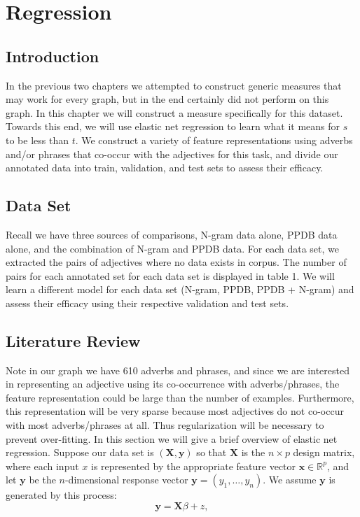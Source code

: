 \section{Regression}

\subsection{Introduction}

In the previous two chapters we attempted to construct generic measures that may work for every graph, but in the end certainly did not perform on this graph. In this chapter we will construct a measure specifically for this dataset. Towards this end, we will use elastic net regression to learn what it means for $s$ to be less than $t$. We construct a variety of feature representations using adverbs and/or phrases that co-occur with the adjectives for this task, and divide our annotated data into train, validation, and test sets to assess their efficacy. 

\subsection{Data Set}

Recall we have three sources of comparisons, N-gram data alone, PPDB data alone, and the combination of N-gram and PPDB data. For each data set, we extracted the pairs of adjectives where no data exists in corpus. The number of pairs for each annotated set for each data set is displayed in table 1. We will learn a different model for each data set (N-gram, PPDB, PPDB + N-gram) and assess their efficacy using their respective validation and test sets. 

\subsection{Literature Review}

Note in our graph we have 610 adverbs and phrases, and since we are interested in representing an adjective using its co-occurrence with adverbs/phrases, the feature representation could be large than the number of examples. Furthermore, this representation will be very sparse because most adjectives do not co-occur with most adverbs/phrases at all. Thus regularization will be necessary to prevent over-fitting. In this section we will give a brief overview of elastic net regression. Suppose our data set is $(\pmb{X}, \pmb{y})$ so that $\pmb{X}$ is the $n \times p$ design matrix, where each input $x$ is represented by the appropriate feature vector $\pmb{x} \in \mathbb{R}^p$, and let $\pmb{y}$ be the $n$-dimensional response vector $\pmb{y} = (y_1, \ldots, y_n)$. We assume $\pmb{y}$ is generated by this process:
	\[
		\pmb{y} = \pmb{X} \mathcal{\beta} + z,
	\]

